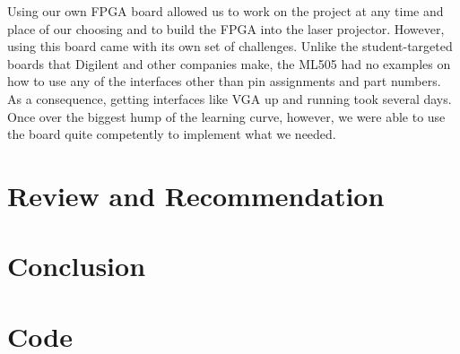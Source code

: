 \documentclass{article}
\begin{document}
Using our own FPGA board allowed us to work on the project at any time and place of our choosing and to build the FPGA into the laser projector. However, using this board came with its own set of challenges. Unlike the student-targeted boards that Digilent and other companies make, the ML505 had no examples on how to use any of the interfaces other than pin assignments and part numbers. As a consequence, getting interfaces like VGA up and running took several days. Once over the biggest hump of the learning curve, however, we were able to use the board quite competently to implement what we needed. 

\section{Review and Recommendation}

\section{Conclusion}

\section{Code}
\end{document}
